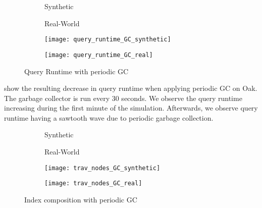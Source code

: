 \documentclass[abstracton,12pt]{scrartcl}
\theoremstyle{definition}
\begin{document}
\begin{figure}[H]
  \centering
  \begin{subfigure}{0.49\linewidth}
    \centering Synthetic
  \end{subfigure}
  \begin{subfigure}{0.49\linewidth}
    \centering Real-World
  \end{subfigure}
  \begin{subfigure}{0.49\linewidth}
    \texttt{[image: query\_runtime\_GC\_synthetic]}
    \caption{}
    \label{fig:query_runtime_GC_synthetic}
  \end{subfigure}
  \begin{subfigure}{0.49\linewidth}
    \texttt{[image: query\_runtime\_GC\_real]}
    \caption{}
    \label{fig:query_runtime_GC_real}
  \end{subfigure}
  \caption{Query Runtime with periodic GC}
\end{figure}

 show the
resulting decrease in query runtime when applying periodic GC on Oak. The
garbage collector is run every 30 seconds. We observe the query runtime
increasing during the first minute of the simulation. Afterwards, we observe
query runtime having a sawtooth wave due to periodic garbage collection.

\begin{figure}[H]
  \centering
  \begin{subfigure}{0.49\linewidth}
    \centering Synthetic
  \end{subfigure}
  \begin{subfigure}{0.49\linewidth}
    \centering Real-World
  \end{subfigure}
  \begin{subfigure}{0.49\linewidth}
    \texttt{[image: trav\_nodes\_GC\_synthetic]}
    \caption{}
    \label{fig:trav_nodes_GC_synthetic}
  \end{subfigure}
  \begin{subfigure}{0.49\linewidth}
    \texttt{[image: trav\_nodes\_GC\_real]}
    \caption{}
    \label{fig:trav_nodes_GC_real}
  \end{subfigure}
  \caption{Index composition with periodic GC}
\end{figure}
\end{document}
